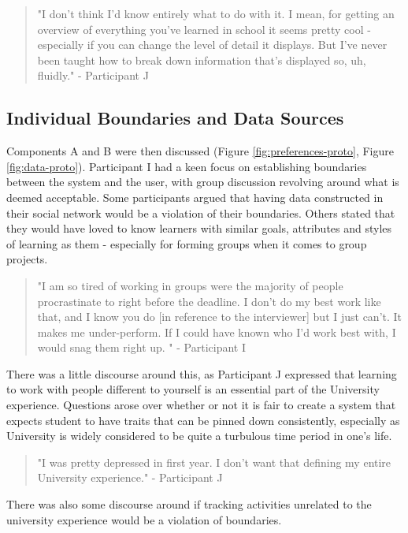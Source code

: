 \documentclass{l4proj}
\begin{document}
\begin{quote}
    "I don't think I'd know entirely what to do with it. I mean, for getting an overview of everything you've learned in school it seems pretty cool - especially if you can change the level of detail it displays. But I've never been taught how to break down information that's displayed so, uh, fluidly." - Participant J
\end{quote}

\subsection{Individual Boundaries and Data Sources}

Components A and B were then discussed (Figure \ref{fig:preferences-proto}, Figure \ref{fig:data-proto}). Participant I had a keen focus on establishing boundaries between the system and the user, with group discussion revolving around what is deemed acceptable. Some participants argued that having data constructed in their social network would be a violation of their boundaries. Others stated that they would have loved to know learners with similar goals, attributes and styles of learning as them - especially for forming groups when it comes to group projects. 

\begin{quote}
    "I am so tired of working in groups were the majority of people procrastinate to right before the deadline. I don't do my best work like that, and I know you do [in reference to the interviewer] but I just can't. It makes me under-perform. If I could have known who I'd work best with, I would snag them right up. " - Participant I
\end{quote}

There was a little discourse around this, as Participant J expressed that learning to work with people different to yourself is an essential part of the University experience. Questions arose over whether or not it is fair to create a system that expects student to have traits that can be pinned down consistently, especially as University is widely considered to be quite a turbulous time period in one's life.

\begin{quote}
    "I was pretty depressed in first year. I don't want that defining my entire University experience." - Participant J
\end{quote}

There was also some discourse around if tracking activities unrelated to the university experience would be a violation of boundaries. 
\end{document}
